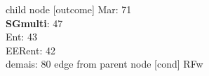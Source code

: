 child {node [outcome] {
Mar: 71\\
\textbf{SGmulti}: 47\\
Ent: 43\\
EERent: 42\\
demais: 80} edge from parent node [cond] {RFw}}
